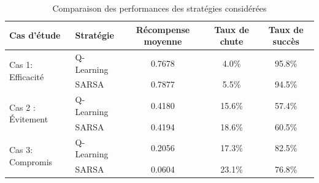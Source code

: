 \documentclass{article}
\begin{document}





\begin{table}[ht]
\centering
\begin{tabular}{llccc}
\toprule
\textbf{Cas d'étude} & \textbf{Stratégie} & \textbf{Récompense moyenne} & \textbf{Taux de chute} & \textbf{Taux de succès} \\
\midrule

\multirow{2}{*}{Cas 1: Efficacité}
  & Q-Learning & 0.7678 & 4.0\% & 95.8\% \\
  & SARSA      & 0.7877 & 5.5\% & 94.5\% \\
\midrule

\multirow{2}{*}{Cas 2 : Évitement}
  & Q-Learning & 0.4180 & 15.6\% & 57.4\% \\
  & SARSA      & 0.4194 & 18.6\% & 60.5\% \\
\midrule

\multirow{2}{*}{Cas 3: Compromis}
  & Q-Learning & 0.2056 & 17.3\% & 82.5\% \\
  & SARSA      & 0.0604 & 23.1\% & 76.8\% \\
  
\bottomrule
\end{tabular}
\vspace{0.2em}
\caption{Comparaison des performances des stratégies considérées}
\label{tab:comparaison}
\end{table}
\end{document}
